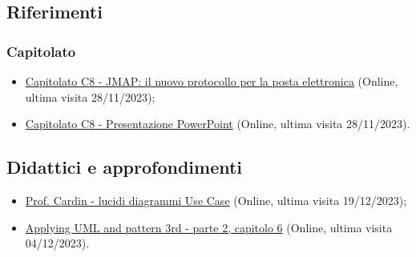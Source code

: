     	\subsection{Riferimenti}
    		\subsubsection{Capitolato}
        		\begin{itemize}
            		\item \href{https://www.math.unipd.it/~tullio/IS-1/2023/Progetto/C8.pdf}{Capitolato C8 - JMAP: il nuovo protocollo per la posta elettronica} (Online, ultima visita 28/11/2023);
            		\item \href{https://www.math.unipd.it/~tullio/IS-1/2023/Progetto/C8p.pdf}{Capitolato C8 - Presentazione PowerPoint} (Online, ultima visita 28/11/2023).
        		\end{itemize}

            \subsection{Didattici e approfondimenti}
                \begin{itemize}
                    \item \href{https://www.math.unipd.it/~rcardin/swea/2022/Diagrammi\%20Use\%20Case.pdf}{Prof. Cardin - lucidi diagrammi Use Case} (Online, ultima visita 19/12/2023);
                    \item \href{https://www.google.com/url?q=http://bsituos.weebly.com/uploads/2/5/2/5/25253721/applying-uml-and-patterns-3rd.pdf&sa=D&source=editors&ust=1703149633309366&usg=AOvVaw1HYTaGpG6ATn1gORX8Czmm}{Applying UML and pattern 3rd - parte 2, capitolo 6} (Online, ultima visita 04/12/2023).
                \end{itemize}
